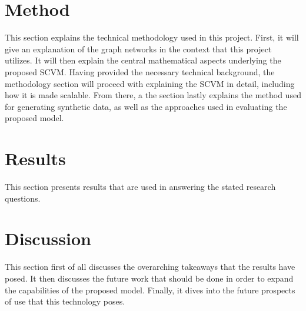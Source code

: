 \documentclass[11pt]{article}
\begin{document}

\clearpage



\section{Method}
\label{sec:Method}
This section explains the technical methodology used in this project.
First, it will give an explanation of the graph networks in the context that this project utilizes. 
It will then explain the central mathematical aspects underlying the proposed SCVM. 
Having provided the necessary technical background, the methodology section will proceed with explaining the SCVM in detail, including how it is made scalable.
From there, a the section lastly explains the method used for generating synthetic data, as well as the approaches used in evaluating the proposed model.










\clearpage


\clearpage

\section{Results}
\label{sec:Results}
This section presents results that are used in answering the stated research questions.


\clearpage

\clearpage

\clearpage

\section{Discussion}
\label{sec:Discussion}
This section first of all discusses the overarching takeaways that the results have posed.
It then discusses the future work that should be done in order to expand the capabilities of the proposed model.
Finally, it dives into the future prospects of use that this technology poses.



\clearpage



\clearpage

%
%
\printbibliography
\clearpage


\end{document}
